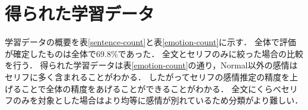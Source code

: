 \section{得られた学習データ}
\begin{table}[ht]
 \centering
  \caption{学習データ(物語別)}
  \vspace{0.3\baselineskip}
  \label{sentence-count}
\end{table}

\begin{table}[ht]
 \centering
  \caption{学習データ(感情別)}
  \vspace{0.3\baselineskip}
  \label{emotion-count}
\end{table}

学習データの概要を表\ref{sentence-count}と表\ref{emotion-count}に示す．
全体で評価が確定したものは全体で69.8\%であった．
全文とセリフのみに絞った場合の比較を行う．
得られた学習データは表\ref{emotion-count}の通り，Normal以外の感情はセリフに多く含まれることがわかる．
したがってセリフの感情推定の精度を上げることで全体の精度をあげることができることがわかる．
全文にくらべセリフのみを対象とした場合はより均等に感情が別れているため分類がより難しい．


